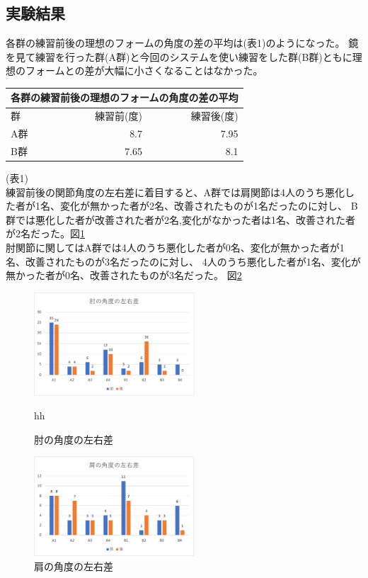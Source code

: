 \documentclass[a4j,10pt]{jsarticle}
\begin{document}
\subsection{実験結果}
各群の練習前後の理想のフォームの角度の差の平均は(表1)のようになった。
鏡を見て練習を行った群(A群)と今回のシステムを使い練習をした群(B群)ともに理想のフォームとの差が大幅に小さくなることはなかった。
\begin{center}
    \begin{tabular}{|l|r|r|} \hline
      \multicolumn{3}{|c|}{各群の練習前後の理想のフォームの角度の差の平均} \\ \hline
      群 & 練習前(度) & 練習後(度) \\ \hline
      A群 & 8.7 & 7.95 \\
      B群& 7.65 & 8.1 \\ \hline
    \end{tabular}
\end{center}
(表1)\\
練習前後の関節角度の左右差に着目すると、A群では肩関節は4人のうち悪化した者が1名、変化が無かった者が2名、改善されたものが1名だったのに対し、
B群では悪化した者が改善された者が2名,変化がなかった者は1名、改善された者が2名だった。図\ref{elbow} \\
肘関節に関してはA群では4人のうち悪化した者が0名、変化が無かった者が1名、改善されたものが3名だったのに対し、
4人のうち悪化した者が1名、変化が無かった者が0名、改善されたものが3名だった。 図\ref{shoulder}
\begin{figure}[htbp]
    \begin{center}
        \includegraphics[width=6cm]{elbow.png}
        \caption{肘の角度の左右差}
        \label{elbow}hh
    \end{center}
\end{figure}
\begin{figure}[htbp]
    \begin{center}
        \includegraphics[width=6cm]{shoulder.png}
        \caption{肩の角度の左右差}
        \label{shoulder}
    \end{center}
\end{figure}
\end{document}
